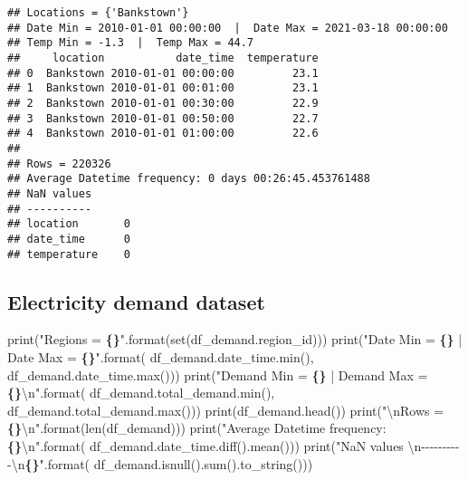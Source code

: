 \documentclass[mstat,12pt,a4paper]{unswthesis}
\newenvironment{Shaded}{\begin{snugshade}}{\end{snugshade}}
\newcommand{\BuiltInTok}[1]{#1}
\newcommand{\CharTok}[1]{\textcolor[rgb]{0.31,0.60,0.02}{#1}}
\newcommand{\NormalTok}[1]{#1}
\newcommand{\SpecialCharTok}[1]{\textcolor[rgb]{0.81,0.36,0.00}{\textbf{#1}}}
\newcommand{\StringTok}[1]{\textcolor[rgb]{0.31,0.60,0.02}{#1}}
\begin{document}
\begin{verbatim}
## Locations = {'Bankstown'}
## Date Min = 2010-01-01 00:00:00  |  Date Max = 2021-03-18 00:00:00
## Temp Min = -1.3  |  Temp Max = 44.7
##     location           date_time  temperature
## 0  Bankstown 2010-01-01 00:00:00         23.1
## 1  Bankstown 2010-01-01 00:01:00         23.1
## 2  Bankstown 2010-01-01 00:30:00         22.9
## 3  Bankstown 2010-01-01 00:50:00         22.7
## 4  Bankstown 2010-01-01 01:00:00         22.6
## 
## Rows = 220326
## Average Datetime frequency: 0 days 00:26:45.453761488
## NaN values 
## ----------
## location       0
## date_time      0
## temperature    0
\end{verbatim}

\bigskip

\subsection{Electricity demand
dataset}\label{electricity-demand-dataset}

\begin{Shaded}
\begin{Highlighting}[]
\BuiltInTok{print}\NormalTok{(}\StringTok{"Regions = }\SpecialCharTok{\{\}}\StringTok{"}\NormalTok{.}\BuiltInTok{format}\NormalTok{(}\BuiltInTok{set}\NormalTok{(df\_demand.region\_id)))}
\BuiltInTok{print}\NormalTok{(}\StringTok{"Date Min = }\SpecialCharTok{\{\}}\StringTok{  |  Date Max = }\SpecialCharTok{\{\}}\StringTok{"}\NormalTok{.}\BuiltInTok{format}\NormalTok{(}
\NormalTok{    df\_demand.date\_time.}\BuiltInTok{min}\NormalTok{(), df\_demand.date\_time.}\BuiltInTok{max}\NormalTok{()))}
\BuiltInTok{print}\NormalTok{(}\StringTok{"Demand Min = }\SpecialCharTok{\{\}}\StringTok{  |  Demand Max = }\SpecialCharTok{\{\}}\CharTok{\textbackslash{}n}\StringTok{"}\NormalTok{.}\BuiltInTok{format}\NormalTok{(}
\NormalTok{    df\_demand.total\_demand.}\BuiltInTok{min}\NormalTok{(), df\_demand.total\_demand.}\BuiltInTok{max}\NormalTok{()))}
\BuiltInTok{print}\NormalTok{(df\_demand.head())}
\BuiltInTok{print}\NormalTok{(}\StringTok{"}\CharTok{\textbackslash{}n}\StringTok{Rows = }\SpecialCharTok{\{\}}\CharTok{\textbackslash{}n}\StringTok{"}\NormalTok{.}\BuiltInTok{format}\NormalTok{(}\BuiltInTok{len}\NormalTok{(df\_demand)))}
\BuiltInTok{print}\NormalTok{(}\StringTok{"Average Datetime frequency: }\SpecialCharTok{\{\}}\CharTok{\textbackslash{}n}\StringTok{"}\NormalTok{.}\BuiltInTok{format}\NormalTok{(}
\NormalTok{    df\_demand.date\_time.diff().mean()))}
\BuiltInTok{print}\NormalTok{(}\StringTok{"NaN values }\CharTok{\textbackslash{}n}\StringTok{{-}{-}{-}{-}{-}{-}{-}{-}{-}{-}}\CharTok{\textbackslash{}n}\SpecialCharTok{\{\}}\StringTok{"}\NormalTok{.}\BuiltInTok{format}\NormalTok{(}
\NormalTok{    df\_demand.isnull().}\BuiltInTok{sum}\NormalTok{().to\_string()))}
\end{Highlighting}
\end{Shaded}
\end{document}
